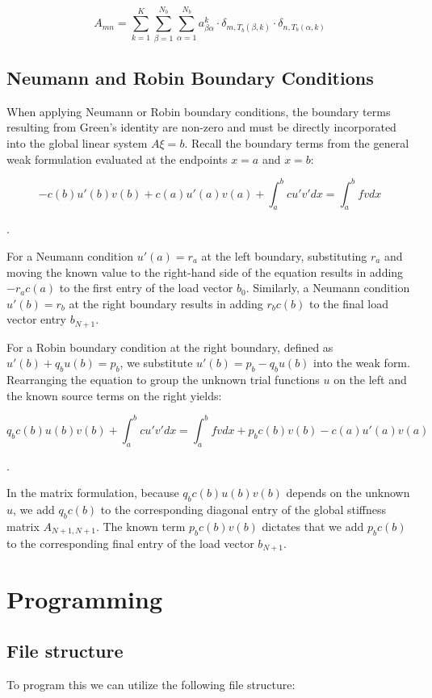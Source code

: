 \documentclass[12pt, oneside]{book}
\begin{document}
$$
A_{m n}=\sum_{k=1}^{K} \sum_{\beta=1}^{N_{b}} \sum_{\alpha=1}^{N_{b}} a_{\beta \alpha}^{k} \cdot \delta_{m, T_{b}(\beta, k)} \cdot \delta_{n, T_{b}(\alpha, k)}
$$

\section{Neumann and Robin Boundary Conditions}

When applying Neumann or Robin boundary conditions, the boundary terms resulting from Green's identity are non-zero and must be directly incorporated into the global linear system $A \xi = b$. Recall the boundary terms from the general weak formulation evaluated at the endpoints $x=a$ and $x=b$:

$$-c(b)u'(b)v(b) + c(a)u'(a)v(a) + \int_{a}^{b} c u' v' dx = \int_{a}^{b} f v dx$$

.

For a Neumann condition $u'(a) = r_a$ at the left boundary, substituting $r_a$ and moving the known value to the right-hand side of the equation results in adding $-r_a c(a)$ to the first entry of the load vector $b_0$. Similarly, a Neumann condition $u'(b) = r_b$ at the right boundary results in adding $r_b c(b)$ to the final load vector entry $b_{N+1}$.

For a Robin boundary condition at the right boundary, defined as $u'(b) + q_b u(b) = p_b$, we substitute $u'(b) = p_b - q_b u(b)$ into the weak form. Rearranging the equation to group the unknown trial functions $u$ on the left and the known source terms on the right yields:

$$q_b c(b)u(b)v(b) + \int_{a}^{b} c u' v' dx = \int_{a}^{b} f v dx + p_b c(b)v(b) - c(a)u'(a)v(a)$$

.

In the matrix formulation, because $q_b c(b)u(b)v(b)$ depends on the unknown $u$, we add $q_b c(b)$ to the corresponding diagonal entry of the global stiffness matrix $A_{N+1, N+1}$. The known term $p_b c(b)v(b)$ dictates that we add $p_b c(b)$ to the corresponding final entry of the load vector $b_{N+1}$.

\chapter{Programming}
\section{File structure}
To program this we can utilize the following file structure: 
\end{document}

